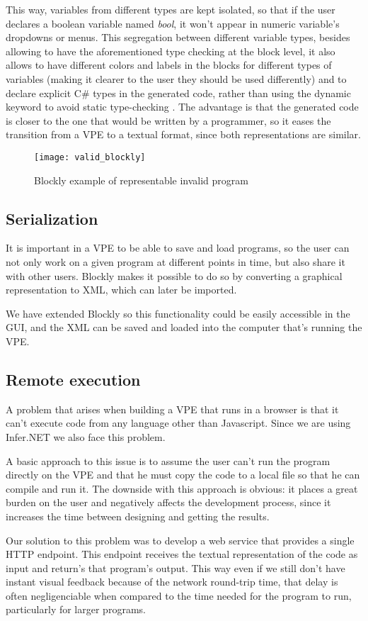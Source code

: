 This way, variables from different types are kept isolated, so that if the user
declares a boolean variable named \textit{bool}, it won't appear in numeric
variable's dropdowns or menus. This segregation between different variable types,
besides allowing to have the aforementioned type checking at the block level, it
also allows to have different colors and labels in the blocks for different types of variables
(making it clearer to the user they should be used differently) and to declare
explicit C# types in the generated code, rather than using
the dynamic keyword to avoid static type-checking \cite{cdyn}. The advantage is that
the generated code is closer to the one that would be written by a programmer,
so it eases the transition from a VPE to a textual format, since both representations
are similar.

\begin{figure}[t]
  \begin{center}
    \leavevmode
    \texttt{[image: valid\_blockly]}
    \caption{Blockly example of representable invalid program}
    \label{fig:valid_blockly}
  \end{center}
\end{figure}

\subsection{Serialization}

It is important in a VPE to be able to save and load programs, so the user can
not only work on a given program at different points in time, but also share it
with other users. Blockly makes it possible to do so by converting a graphical
representation to XML, which can later be imported.

We have extended Blockly so this functionality could be easily accessible in the
GUI, and the XML can be saved and loaded into the computer that's running the VPE.

\subsection{Remote execution}

A problem that arises when building a VPE that runs in a browser is that it can't
execute code from any language other than Javascript. Since we are using Infer.NET
we also face this problem.

A basic approach to this issue is to assume the user can't run the program directly
on the VPE and that he must copy the code to a local file so that he can compile
and run it. The downside with this approach is obvious: it places a great burden
on the user and negatively affects the development process, since it increases
the time between designing and getting the results.

Our solution to this problem was to develop a web service that provides a single
HTTP endpoint. This endpoint receives the textual representation of the code as
input and return's that program's output. This way even if we still don't have
instant visual feedback because of the network round-trip time, that delay is
often negligenciable when compared to the time needed for the program to run,
particularly for larger programs.
